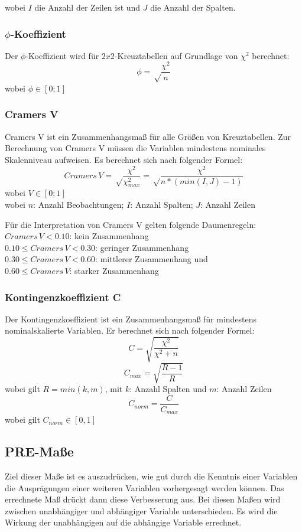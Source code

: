 \documentclass[11pt,a4paper]{article}
\begin{document}
wobei $I$ die Anzahl der Zeilen ist und $J$ die Anzahl der Spalten.

\subsubsection{\texorpdfstring{$\phi$-Koeffizient}{Phi-Koeffizient}}
Der $\phi$-Koeffizient wird für $2x2$-Kreuztabellen auf Grundlage von $\chi^2$ berechnet: \\
$$\phi = \sqrt \frac{\chi^2}{n}$$
wobei $\phi \in [0;1]$\\

\subsubsection{Cramers V}
Cramers V ist ein Zusammenhangsmaß für alle Größen von Kreuztabellen. Zur Berechnung von Cramers V müssen die Variablen mindestens nominales Skalenniveau aufweisen. Es berechnet sich nach folgender Formel: \\
$$Cramers \, V = \sqrt \frac {\chi^2}{\chi_{max}^2}= \sqrt \frac {\chi^2}{n \ast (min(I, J)-1)}$$ 
wobei $V \in [0;1]$ \\
wobei $n$: Anzahl Beobachtungen; $I$: Anzahl Spalten; $J$: Anzahl Zeilen
\newline

Für die Interpretation von Cramers V gelten folgende Daumenregeln: \\
$Cramers \, V < 0.10$: kein Zusammenhang\\
$0.10 \leq Cramers \, V < 0.30$: geringer Zusammenhang \\
$0.30 \leq Cramers \, V < 0.60$: mittlerer Zusammenhang und\\
$0.60 \leq Cramers \, V$: starker Zusammenhang\\

\subsubsection{Kontingenzkoeffizient C}
Der Kontingenzkoeffizient ist ein Zusammenhangsmaß für mindestens nominalskalierte Variablen. Er berechnet sich nach folgender Formel: 
$$C = \sqrt {\frac {\chi^2}{\chi^2 + n}}$$
$$C_{max} = \sqrt{\frac{R-1}{R}}$$
wobei gilt $R = min(k,m)$, mit $k$: Anzahl Spalten und $m$: Anzahl Zeilen\\

$$C_{norm} = \frac{C}{C_{max}}$$
wobei gilt $C_{norm} \in [0, 1]$

\subsection{PRE-Maße}
Ziel dieser Maße ist es auszudrücken, wie gut durch die Kenntnis einer Variablen die Ausprägungen einer weiteren Variablen vorhergesagt werden können. Das errechnete Maß drückt dann diese Verbesserung aus. Bei diesen Maßen wird zwischen unabhängiger und abhängiger Variable unterschieden. Es wird die Wirkung der unabhängigen auf die abhängige Variable errechnet. 
\end{document}
